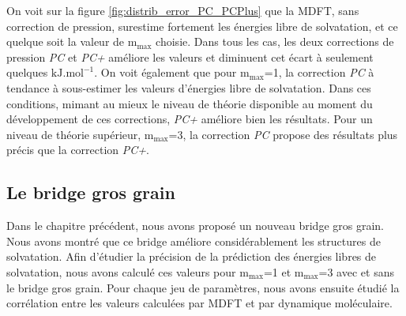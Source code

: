 On voit sur la figure \ref{fig:distrib_error_PC_PCPlus} que la MDFT, sans correction de pression, surestime fortement les énergies libre de solvatation, et ce quelque soit la valeur de $\mathrm{m}_\mathrm{max}$ choisie. Dans tous les cas, les deux corrections de pression \textit{PC} et \textit{PC+} améliore les valeurs et diminuent cet écart à seulement quelques $\mathrm{kJ.mol}^{-1}$. On voit également que pour $\mathrm{m}_\mathrm{max}$=1, la correction \textit{PC} à tendance à sous-estimer les valeurs d'énergies libre de solvatation. Dans ces conditions, mimant au mieux le niveau de théorie disponible au moment du développement de ces corrections, \textit{PC+} améliore bien les résultats. Pour un niveau de théorie supérieur, $\mathrm{m}_\mathrm{max}$=3, la correction \textit{PC} propose des résultats plus précis que la correction \textit{PC+}.


\subsection{Le bridge gros grain}
Dans le chapitre précédent, nous avons proposé un nouveau bridge gros grain. Nous avons montré que ce bridge améliore considérablement les structures de solvatation. Afin d'étudier la précision de la prédiction des énergies libres de solvatation, nous avons calculé ces valeurs pour $\mathrm{m}_\mathrm{max}$=1 et $\mathrm{m}_\mathrm{max}$=3 avec et sans le bridge gros grain. Pour chaque jeu de paramètres, nous avons ensuite étudié la corrélation entre les valeurs calculées par MDFT et par dynamique moléculaire.



